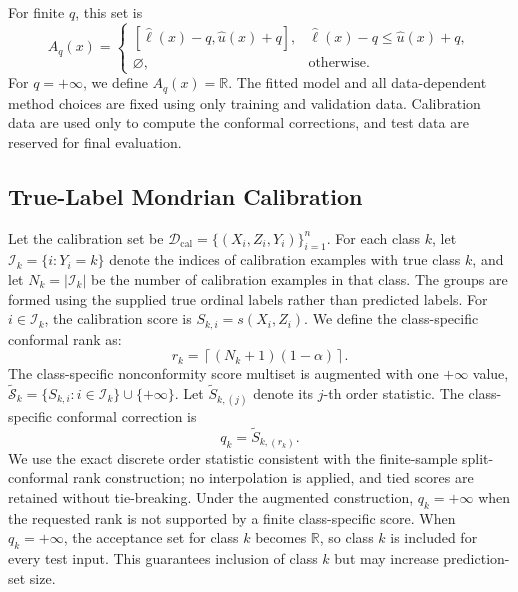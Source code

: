 \documentclass[conference]{IEEEtran}
\begin{document}
For finite \(q\), this set is
\begin{equation}
A_q(x)=
\begin{cases}
[\widehat\ell(x)-q,\widehat u(x)+q], &
  \widehat\ell(x)-q\le\widehat u(x)+q, \\[3pt]
  \varnothing, &
\text{otherwise}.
\end{cases}
\label{eq:score_inversion}
\end{equation}
For \(q=+\infty\), we define \(A_q(x)=\mathbb{R}\). The fitted model and all data-dependent method choices are fixed using only training and validation data. Calibration data are used only to compute the conformal corrections, and test data are reserved for final evaluation.

\subsection{True-Label Mondrian Calibration}
\label{subsec:mondrian_calibration}
Let the calibration set be \(\mathcal{D}_{\mathrm{cal}}=\{(X_i,Z_i,Y_i)\}_{i=1}^{n}\). For each class \(k\), let \(\mathcal{I}_k=\{i:Y_i=k\}\) denote the indices of calibration examples with true class \(k\), and let \(N_k=\lvert\mathcal{I}_k\rvert\) be the number of calibration examples in that class. The groups are formed using the supplied true ordinal labels rather than predicted labels. For \(i\in\mathcal{I}_k\), the calibration score is \(S_{k,i}=s(X_i,Z_i)\). We define the class-specific conformal rank as:
\begin{equation}
r_k
=
\left\lceil
(N_k+1)(1-\alpha)
\right\rceil.
\label{eq:conformal_rank}
\end{equation}
The class-specific nonconformity score multiset is augmented with one \(+\infty\) value, \(\widetilde{\mathcal{S}}_k=\{S_{k,i}:i\in\mathcal{I}_k\}\cup\{+\infty\}\). Let \(\widetilde S_{k,(j)}\) denote its \(j\)-th order statistic. The class-specific conformal correction is
\begin{equation}
q_k=
\widetilde S_{k,(r_k)}.
\label{eq:class_correction}
\end{equation}
We use the exact discrete order statistic consistent with the finite-sample split-conformal rank construction; no interpolation is applied, and tied scores are retained without tie-breaking. Under the augmented construction, \(q_k=+\infty\) when the requested rank is not supported by a finite class-specific score. When \(q_k=+\infty\), the acceptance set for class \(k\) becomes \(\mathbb{R}\), so class \(k\) is included for every test input. This guarantees inclusion of class \(k\) but may increase prediction-set size.
\end{document}
